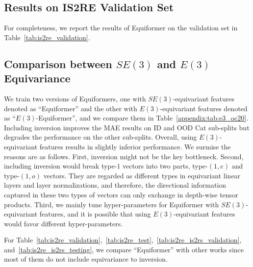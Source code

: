 \subsection{Results on IS2RE Validation Set}
\label{appendix:subsec:is2re_validation}
For completeness, we report the results of Equiformer on the validation set in Table~\ref{tab:is2re_validation}.


\subsection{Comparison between $SE(3)$ and $E(3)$ Equivariance}
\label{appendix:subsec:e3_oc20}
We train two versions of Equiformers, one with $SE(3)$-equivariant features denoted as ``Equiformer'' and the other with $E(3)$-equivariant features denoted as ``$E(3)$-Equiformer'', and we compare them in Table~\ref{appendix:tab:e3_oc20}.
Including inversion improves the MAE results on ID and OOD Cat sub-splits but degrades the performance on the other sub-splits.
Overall, using $E(3)$-equivariant features results in slightly inferior performance.
We surmise the reasons are as follows. 
First, inversion might not be the key bottleneck. %
Second, including inversion would break type-$1$ vectors into two parts, type-$(1, e)$ and type-$(1, o)$ vectors.
They are regarded as different types in equivariant linear layers and layer normalizations, and therefore, the directional information captured in these two types of vectors can only exchange in depth-wise tensor products.
Third, we mainly tune hyper-parameters for Equiformer with $SE(3)$-equivariant features, and it is possible that using $E(3)$-equivariant features would favor different hyper-parameters.

For Table~\ref{tab:is2re_validation},~\ref{tab:is2re_test},~\ref{tab:is2re_is2rs_validation}, and~\ref{tab:is2re_is2rs_testing}, we compare ``Equiformer'' with other works since most of them do not include equivariance to inversion.




